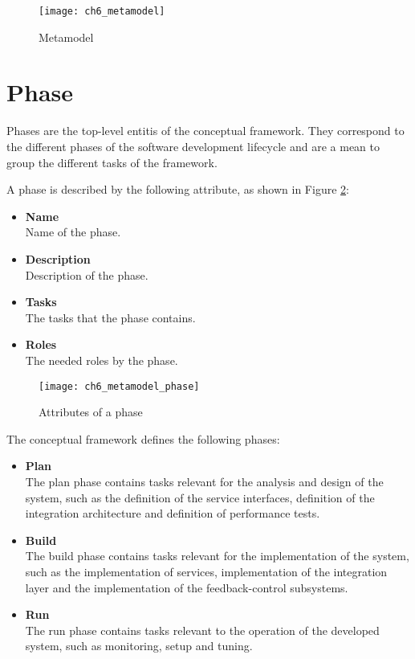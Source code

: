 \begin{figure}
	[htpb] \centering 
	\texttt{[image: ch6\_metamodel]} 
	\caption{Metamodel} 
	\label{fig:ch6_metamodel} 
\end{figure}

\section{Phase}
Phases are the top-level entitis of the conceptual framework. They correspond to the different phases of the software development lifecycle and are a mean to group the different tasks of the framework.

A phase is described by the following attribute, as shown in Figure \ref{fig:ch6_metamodel_phase}:
\begin{itemize}
	\item \textbf{Name}\\
	Name of the phase.
	\item \textbf{Description}\\
	Description of the phase.
	\item \textbf{Tasks}\\
	The tasks that the phase contains.
	\item \textbf{Roles}\\
	The needed roles by the phase.
\end{itemize}

\begin{figure}[htpb] \centering 
	\texttt{[image: ch6\_metamodel\_phase]} 
	\caption{Attributes of a phase} 
	\label{fig:ch6_metamodel_phase} 
\end{figure}

The conceptual framework defines the following phases:
\begin{itemize}
	\item \textbf{Plan}\\
	The plan phase contains tasks relevant for the analysis and design of the system, such as the definition of the service interfaces, definition of the integration architecture and definition of performance tests.
	\item \textbf{Build}\\
	The build phase contains tasks relevant for the implementation of the system, such as the implementation of services, implementation of the integration layer and the implementation of the feedback-control subsystems.
	\item \textbf{Run}\\
	The run phase contains tasks relevant to the operation of the developed system, such as monitoring, setup and tuning.
\end{itemize}

